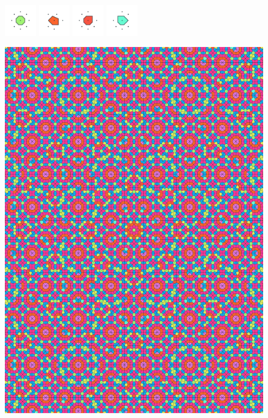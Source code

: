 \documentclass[text.tex]{subfiles}
\begin{document}
\begin{figure}[h!]
\includegraphics[width=0.12\textwidth]{img/results/circle8/circle8_139906_(-508_211alpha_1)_005.pdf}
\includegraphics[width=0.12\textwidth]{img/results/circle8/circle8_139906_(-508_211alpha_1)_006.pdf}
\includegraphics[width=0.12\textwidth]{img/results/circle8/circle8_139906_(-508_211alpha_1)_007.pdf}
\includegraphics[width=0.12\textwidth]{img/results/circle8/circle8_139906_(-508_211alpha_1)_008.pdf}
\end{figure}

\begin{figure}[h!]
\centering
\includegraphics[width=1\textwidth]{img/results/circle8/quasi_circle_139906_(-508_211alpha_1).pdf}
\end{figure}
\end{document}
